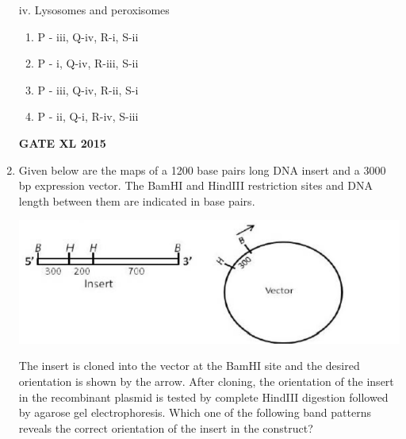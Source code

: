 \documentclass[journal,12pt,onecolumn]{IEEEtran}
\begin{document}
\begin{enumerate}
\begin{minipage}{0.5\textwidth}
\begin{flushleft}
iv. Lysosomes and peroxisomes
	\end{flushleft}
\end{minipage}
    \begin{enumerate}
            \item P - iii, Q-iv, R-i, S-ii
            \item P - i, Q-iv, R-iii, S-ii
            \item P - iii, Q-iv, R-ii, S-i
            \item P - ii, Q-i, R-iv, S-iii
    \end{enumerate}
\begin{flushright}\textbf{GATE XL 2015}\end{flushright}
\item Given below are the maps of a 1200 base pairs  long DNA insert and a 3000 bp expression vector. The BamHI  and HindIII  restriction sites and DNA length between them are indicated in base pairs.

	\includegraphics[width=\textwidth]{45}

The insert is cloned into the vector at the BamHI site and the desired orientation is shown by the arrow. After cloning, the orientation of the insert in the recombinant plasmid is tested by complete HindIII digestion followed by agarose gel electrophoresis. Which one of the following band patterns reveals the correct orientation of the insert in the construct?
    

\end{enumerate}
\end{document}
